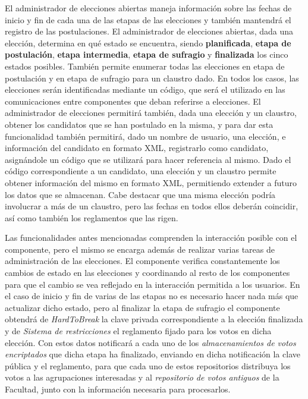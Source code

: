 \label{admin_elecciones}

El administrador de elecciones abiertas maneja información sobre las fechas de inicio y fin de cada una de las etapas de las elecciones y también mantendrá el registro de las postulaciones. 
El administrador de elecciones abiertas, dada una elección, determina en qué estado se encuentra, siendo {\bf planificada}, {\bf etapa de postulación}, {\bf etapa intermedia},  {\bf etapa de sufragio} y {\bf finalizada} los cinco estados posibles. También permite enumerar todas las elecciones en etapa de postulación y en etapa de sufragio para un claustro dado. En todos los casos, las elecciones serán identificadas mediante un código, que será el utilizado en las comunicaciones entre componentes que deban referirse a elecciones.
El administrador de elecciones permitirá también, dada una elección y un claustro, obtener los candidatos que se han postulado en la misma, y para dar esta funcionalidad también permitirá, dado un nombre de usuario, una elección, e información del candidato en formato XML, registrarlo como candidato, asignándole un código que se utilizará para hacer referencia al mismo.
Dado el código correspondiente a un candidato, una elección y un claustro permite obtener información del mismo en formato XML, permitiendo extender a futuro los datos que se almacenan. 
Cabe destacar que una misma elección podría involucrar a más de un claustro, pero las fechas en todos ellos deberán coincidir, así como también los reglamentos que las rigen.


Las funcionalidades antes mencionadas comprenden la interacción posible con el componente, pero el mismo se encarga además de realizar varias tareas de administración de las elecciones. El componente verifica constantemente los cambios de estado en las elecciones y coordinando al resto de los componentes para que el cambio se vea reflejado en la interacción permitida a los usuarios. En el caso de inicio y fin de varias de las etapas no es necesario hacer nada más que actualizar dicho estado, pero al finalizar la etapa de sufragio el componente obtendrá de \emph{HardToBreak} la clave privada correspondiente a la elección finalizada y de \emph{Sistema de restricciones} el reglamento fijado para los votos en dicha elección. Con estos datos notificará a cada uno de los \emph{almacenamientos de votos encriptados} que dicha etapa ha finalizado, enviando en dicha notificación la clave pública y el reglamento, para que cada uno de estos repositorios distribuya los votos a las agrupaciones interesadas y al \emph{repositorio de votos antiguos} de la Facultad, junto con la información necesaria para procesarlos.


